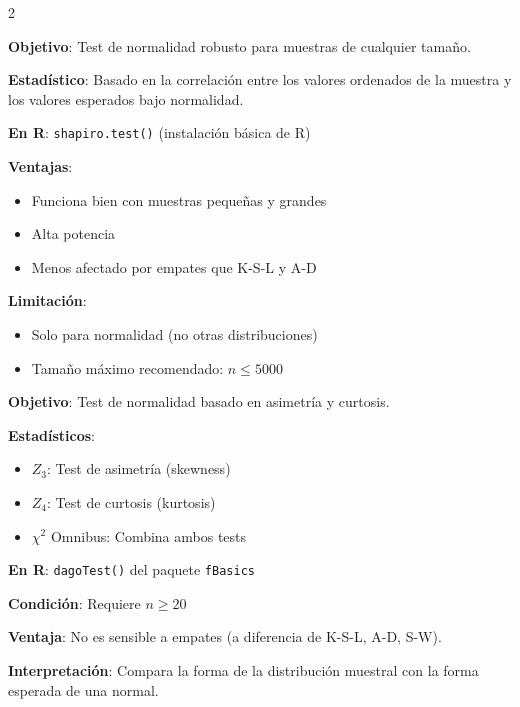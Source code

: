 \documentclass[10pt,a4paper]{article}
\begin{document}
\begin{multicols}{2}
    \begin{tcolorbox}[title=Test de Shapiro-Wilk (S-W), equal height group=BA4]
        \textbf{Objetivo}: Test de normalidad robusto para muestras de cualquier tamaño.
        
        \textbf{Estadístico}: Basado en la correlación entre los valores ordenados de la muestra y los valores esperados bajo normalidad.
        
        \textbf{En R}: \texttt{shapiro.test()} (instalación básica de R)
        
        \textbf{Ventajas}:
        \begin{itemize}
            \item Funciona bien con muestras pequeñas y grandes
            \item Alta potencia
            \item Menos afectado por empates que K-S-L y A-D
        \end{itemize}
        
        \textbf{Limitación}: 
        \begin{itemize}
            \item Solo para normalidad (no otras distribuciones)
            \item Tamaño máximo recomendado: $n \leq 5000$
        \end{itemize}
    \end{tcolorbox}
    \begin{tcolorbox}[title=Test de D'Agostino-Pearson, equal height group=BA4]
        \textbf{Objetivo}: Test de normalidad basado en asimetría y curtosis.
        
        \textbf{Estadísticos}:
        \begin{itemize}
            \item $Z_3$: Test de asimetría (skewness)
            \item $Z_4$: Test de curtosis (kurtosis)
            \item $\chi^2$ Omnibus: Combina ambos tests
        \end{itemize}
        
        \textbf{En R}: \texttt{dagoTest()} del paquete \texttt{fBasics}
        
        \textbf{Condición}: Requiere $n \geq 20$
        
        \textbf{Ventaja}: No es sensible a empates (a diferencia de K-S-L, A-D, S-W).
        
        \textbf{Interpretación}: Compara la forma de la distribución muestral con la forma esperada de una normal.
    \end{tcolorbox}
\end{multicols}
\end{document}
